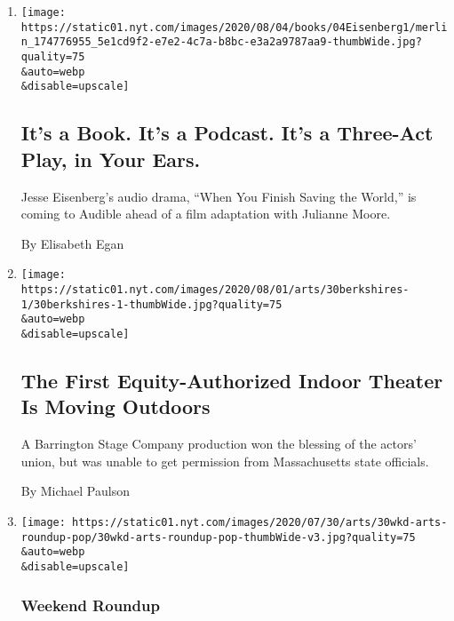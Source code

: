 \begin{enumerate}
\def\labelenumi{\arabic{enumi}.}
\item
  \href{/2020/08/02/books/jesse-eisenberg-when-you-finish-saving-the-world-audio.html}{}

  \texttt{[image: https://static01.nyt.com/images/2020/08/04/books/04Eisenberg1/merlin\_174776955\_5e1cd9f2-e7e2-4c7a-b8bc-e3a2a9787aa9-thumbWide.jpg?quality=75\\\&auto=webp\\\&disable=upscale]}

  \hypertarget{its-a-book-its-a-podcast-its-a-three-act-play-in-your-ears}{%
  \subsection{It's a Book. It's a Podcast. It's a Three-Act Play, in
  Your
  Ears.}\label{its-a-book-its-a-podcast-its-a-three-act-play-in-your-ears}}

  Jesse Eisenberg's audio drama, ``When You Finish Saving the World,''
  is coming to Audible ahead of a film adaptation with Julianne Moore.

  By Elisabeth Egan
\item
  \href{/2020/07/30/theater/the-first-equity-authorized-indoor-theater-is-moving-outdoors.html}{}

  \texttt{[image: https://static01.nyt.com/images/2020/08/01/arts/30berkshires-1/30berkshires-1-thumbWide.jpg?quality=75\\\&auto=webp\\\&disable=upscale]}

  \hypertarget{the-first-equity-authorized-indoor-theater-is-moving-outdoors}{%
  \subsection{The First Equity-Authorized Indoor Theater Is Moving
  Outdoors}\label{the-first-equity-authorized-indoor-theater-is-moving-outdoors}}

  A Barrington Stage Company production won the blessing of the actors'
  union, but was unable to get permission from Massachusetts state
  officials.

  By Michael Paulson
\item
  \href{/2020/07/30/arts/things-to-do-weekend-coronavirus.html}{}

  \texttt{[image: https://static01.nyt.com/images/2020/07/30/arts/30wkd-arts-roundup-pop/30wkd-arts-roundup-pop-thumbWide-v3.jpg?quality=75\\\&auto=webp\\\&disable=upscale]}

  \hypertarget{weekend-roundup}{%
  \subsubsection{Weekend Roundup}\label{weekend-roundup}}


\end{enumerate}
